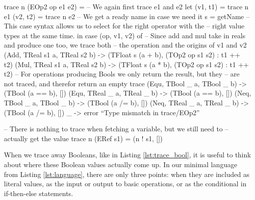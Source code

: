 \begin{haskell}[caption=Tracing away Boolean values, label=lst:trace_bool, gobble=12]
            trace n (EOp2 op e1 e2) =
                -- We again first trace e1 and e2
                let (v1, t1) = trace n e1
                    (v2, t2) = trace n e2
                    -- We get a ready name in case we need it
                    s = getName
                -- This case syntax allows us to select for the right operator with the 
                -- right value types at the same time.
                in  case (op, v1, v2) of
                    -- Since add and mul take in reals and produce one too, we trace both 
                    -- the operation and the origins of v1 and v2
                    (Add, TReal s1 a, TReal s2 b) -> (TFloat s (a + b),
                        (TOp2 op s1 s2) : t1 ++ t2)
                    (Mul, TReal s1 a, TReal s2 b) -> (TFloat s (a * b),
                        (TOp2 op s1 s2) : t1 ++ t2)
                    -- For operations producing Bools we only return the result, but they
                    -- are not traced, and therefor return an empty trace
                    (Equ, TBool _  a, TBool _  b) -> (TBool (a == b), [])
                    (Equ, TReal _  a, TReal _  b) -> (TBool (a == b), [])
                    (Neq, TBool _  a, TBool _  b) -> (TBool (a /= b), [])
                    (Neq, TReal _  a, TReal _  b) -> (TBool (a /= b), [])
                    _                             -> error ``Type mismatch in trace/EOp2''

            -- There is nothing to trace when fetching a variable, but we still need to
            -- actually get the value
            trace n (ERef s1) = (n ! s1, [])
        \end{haskell}

        When we trace away Booleans, like in Listing \ref{lst:trace_bool}, it is useful to think about where these Boolean values actually come up.
        In our minimal language from Listing \ref{lst:language}, there are only three points: when they are included as literal values, as the input or output to basic operations, or as the conditional in if-then-else statements.
        

